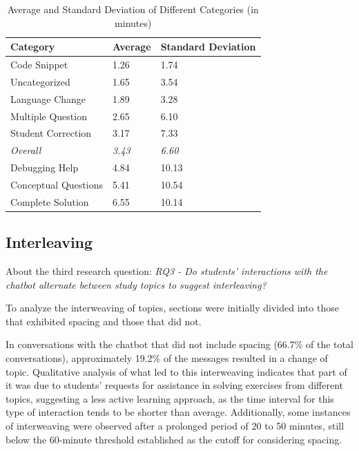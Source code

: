 \documentclass[a4paper,twoside]{article}
\begin{document}
\begin{table}[htbp]
  \caption{Average and Standard Deviation of Different Categories (in minutes)}
  \begin{center}
    \renewcommand{\arraystretch}{1.6} %
    \begin{tabular}{p{4cm} p{4cm} p{4cm}} %
      \hline
      \textbf{Category} & \textbf{Average} & \textbf{Standard Deviation} \\
      \hline
      Code Snippet & 1.26 & 1.74 \\
      Uncategorized & 1.65 & 3.54 \\
      Language Change & 1.89 & 3.28 \\
      Multiple Question & 2.65 & 6.10 \\
      Student Correction & 3.17 & 7.33 \\
      \hdashline
      \textit{Overall} & \textit{3.43} & \textit{6.60} \\
      \hdashline
      Debugging Help & 4.84 & 10.13 \\
      Conceptual Questions & 5.41 & 10.54 \\
      Complete Solution & 6.55 & 10.14 \\
      \hline
    \end{tabular}
    \label{tab:averages}
  \end{center}
\end{table}

\subsection{Interleaving}

About the third research question: \textit{RQ3 - Do students' interactions with
the chatbot alternate between study topics to suggest interleaving?}

To analyze the interweaving of topics, sections were initially divided into
those that exhibited spacing and those that did not.

In conversations with the chatbot that did not include spacing (66.7\% of the total
conversations), approximately 19.2\% of the messages resulted in a change of
topic. Qualitative analysis of what led to this interweaving indicates that
part of it was due to students' requests for assistance in solving exercises
from different topics, suggesting a less active learning approach, as the time
interval for this type of interaction tends to be shorter than average.
Additionally, some instances of interweaving were observed after a prolonged
period of 20 to 50 minutes, still below the 60-minute threshold established as
the cutoff for considering spacing.
\end{document}
